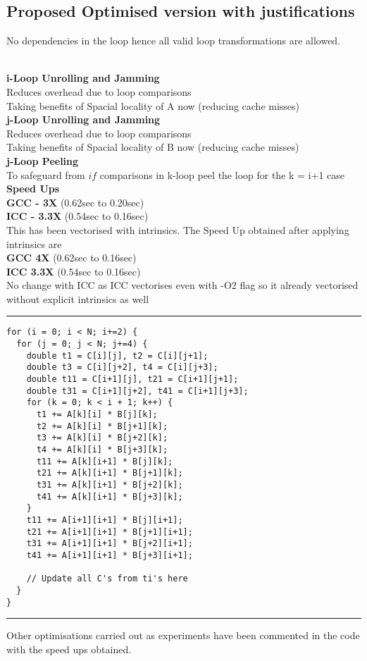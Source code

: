 \documentclass[a4paper]{article}
\begin{document}
\subsection{Proposed Optimised version with justifications}
No dependencies in the loop hence all valid loop transformations are allowed. \\ \\
\begin{minipage}{0.4\textwidth}

{\bf i-Loop Unrolling and Jamming} \\
Reduces overhead due to loop comparisons \\ 
Taking benefits of Spacial locality of A now (reducing cache misses) \\

{\bf j-Loop Unrolling and Jamming} \\
Reduces overhead due to loop comparisons \\ 
Taking benefits of Spacial locality of B now (reducing cache misses) \\

{\bf j-Loop Peeling} \\
To safeguard from $if$ comparisons in k-loop peel the loop for the k = i+1 case \\

{\bf Speed Ups } \\
{\bf GCC - 3X} (0.62sec to 0.20sec) \\
{\bf ICC - 3.3X} (0.54sec to 0.16sec) \\

This has been vectorised with intrinsics. The Speed Up obtained after applying intrinsics are \\
{\bf GCC 4X} (0.62sec to 0.16sec) \\
{\bf ICC 3.3X} (0.54sec to 0.16sec)\\
No change with ICC as ICC vectorises even with -O2 flag so it already vectorised without explicit intrinsics as well
\end{minipage}
\begin{minipage}{0.6\textwidth}
\hrule
\begin{lstlisting}
for (i = 0; i < N; i+=2) {
  for (j = 0; j < N; j+=4) {
    double t1 = C[i][j], t2 = C[i][j+1];
    double t3 = C[i][j+2], t4 = C[i][j+3];
    double t11 = C[i+1][j], t21 = C[i+1][j+1];
    double t31 = C[i+1][j+2], t41 = C[i+1][j+3];
    for (k = 0; k < i + 1; k++) {
      t1 += A[k][i] * B[j][k];
      t2 += A[k][i] * B[j+1][k];
      t3 += A[k][i] * B[j+2][k];
      t4 += A[k][i] * B[j+3][k];
      t11 += A[k][i+1] * B[j][k];
      t21 += A[k][i+1] * B[j+1][k];
      t31 += A[k][i+1] * B[j+2][k];
      t41 += A[k][i+1] * B[j+3][k];
    }
    t11 += A[i+1][i+1] * B[j][i+1];
    t21 += A[i+1][i+1] * B[j+1][i+1];
    t31 += A[i+1][i+1] * B[j+2][i+1];
    t41 += A[i+1][i+1] * B[j+3][i+1];

    // Update all C's from ti's here
  }
}
\end{lstlisting}
\hrule 
\end{minipage}
\vspace{0.2cm}
\newline
Other optimisations carried out as experiments have been commented in the code with the speed ups obtained.
\end{document}
